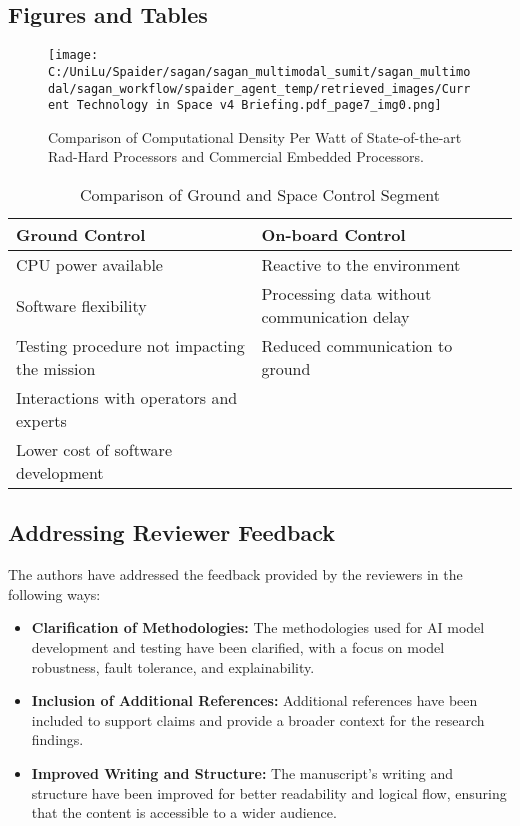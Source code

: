 \documentclass[a4paper,12pt]{article}
\begin{document}
\subsection{Figures and Tables}

\begin{figure}[htbp]
    \centering
    \texttt{[image: C:/UniLu/Spaider/sagan/sagan\_multimodal\_sumit/sagan\_multimodal/sagan\_workflow/spaider\_agent\_temp/retrieved\_images/Current Technology in Space v4 Briefing.pdf\_page7\_img0.png]}
    \caption{Comparison of Computational Density Per Watt of State-of-the-art Rad-Hard Processors and Commercial Embedded Processors.}
    \label{fig:processor-comparison}
\end{figure}

\begin{table}[htbp]
    \centering
    \caption{Comparison of Ground and Space Control Segment}
    \label{tab:control-segment-comparison}
    \begin{tabular}{|l|l|}
        \hline
        \textbf{Ground Control} & \textbf{On-board Control} \\
        \hline
        CPU power available & Reactive to the environment \\
        Software flexibility & Processing data without communication delay \\
        Testing procedure not impacting the mission & Reduced communication to ground \\
        Interactions with operators and experts & \\
        Lower cost of software development & \\
        \hline
    \end{tabular}
\end{table}

\subsection{Addressing Reviewer Feedback}

The authors have addressed the feedback provided by the reviewers in the following ways:

\begin{itemize}
    \item \textbf{Clarification of Methodologies:} The methodologies used for AI model development and testing have been clarified, with a focus on model robustness, fault tolerance, and explainability.
    \item \textbf{Inclusion of Additional References:} Additional references have been included to support claims and provide a broader context for the research findings.
    \item \textbf{Improved Writing and Structure:} The manuscript's writing and structure have been improved for better readability and logical flow, ensuring that the content is accessible to a wider audience.
\end{itemize}
\end{document}
